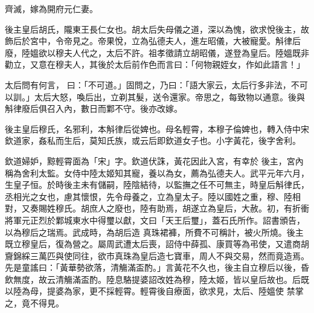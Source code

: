 \begin{pinyinscope}
 齊滅，嫁為開府元仁妻。



 後主皇后胡氏，隴東王長仁女也。胡太后失母儀之道，深以為愧，欲求悅後主，故飾后於宮中，令帝見之。帝果悅，立為弘德夫人，進左昭儀，大被寵愛。斛律后廢，陸媼欲以穆夫人代之，太后不許。祖孝徵請立胡昭儀，遂登為皇后。陸媼既非勸立，又意在穆夫人，其後於太后前作色而言曰：「何物親姪女，作如此語言！」



 太后問有何言，
 曰：「不可道。」固問之，乃曰：「語大家云，太后行多非法，不可以訓。」太后大怒，喚后出，立剃其髮，送令還家。帝思之，每致物以通意。後與斛律廢后俱召入內，數日而鄴不守。後亦改嫁。



 後主皇后穆氏，名邪利，本斛律后從婢也。母名輕霄，本穆子倫婢也，轉入侍中宋欽道家，姦私而生后，莫知氏族，或云后即欽道女子也。小字黃花，後字舍利。



 欽道婦妒，黥輕霄面為「宋」字。欽道伏誅，黃花因此入宮，有幸於
 後主，宮內稱為舍利太監。女侍中陸太姬知其寵，養以為女，薦為弘德夫人。武平元年六月，生皇子恒。於時後主未有儲嗣，陸陰結待，以監撫之任不可無主，時皇后斛律氏，丞相光之女也，慮其懷恨，先令母養之，立為皇太子。陸以國姓之重，穆、陸相對，又奏賜姓穆氏。胡庶人之廢也，陸有助焉，胡遂立為皇后，大赦。初，有折衝將軍元正烈於鄴城東水中得璽以獻，文曰「天王后璽」，蓋石氏所作。詔書頒告，以為穆后之瑞焉。武成時，為胡后造
 真珠裙褲，所費不可稱計，被火所燒。後主既立穆皇后，復為營之。屬周武遭太后喪，詔侍中薛孤、康買等為弔使，又遣商胡齎錦綵三萬匹與使同往，欲市真珠為皇后造七寶車，周人不與交易，然而竟造焉。先是童謠曰：「黃華勢欲落，清觴滿盃酌。」言黃花不久也，後主自立穆后以後，昏飲無度，故云清觴滿盃酌。陸息駱提婆詔改姓為穆，陸太姬，皆以皇后故也。后既以陸為母，提婆為家，更不採輕霄。輕霄後自療面，欲求見，太后、陸媼使
 禁掌之，竟不得見。



\end{pinyinscope}